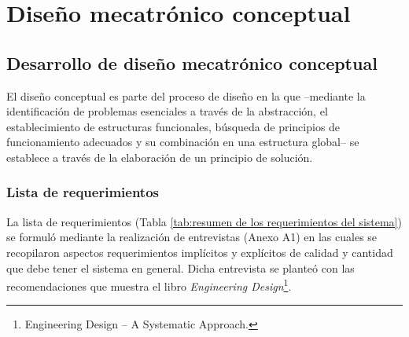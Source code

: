 
\pagestyle{myportland}
\doublespacing
\chapter[----- Diseño mecatrónico conceptual]{Diseño mecatrónico conceptual}
\thispagestyle{myportland}

\section{Desarrollo de diseño mecatrónico conceptual}
\label{sec:desarrollo del diseno mecatronico conceptual}

El diseño conceptual es parte del proceso de diseño en la que --mediante la identificación de problemas esenciales a través de la abstracción, el establecimiento de estructuras funcionales, búsqueda de principios de funcionamiento adecuados y su combinación en una estructura global-- se establece a través de la elaboración de un principio de solución.\cite[p.~159]{Pahl2007}

\subsection{Lista de requerimientos}

La lista de requerimientos (Tabla \ref{tab:resumen de los requerimientos del sistema}) se formuló mediante la realización de entrevistas (Anexo  A1) en las cuales se recopilaron aspectos requerimientos implícitos y explícitos de calidad y cantidad que debe tener el sistema en general. Dicha entrevista se planteó con las recomendaciones que muestra el libro \textit{Engineering Design}\footnote{Engineering Design – A Systematic Approach.\cite[p.~144-158]{Pahl2007}}.

